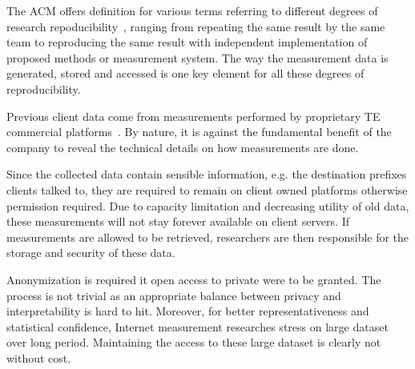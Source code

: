 The \acf{ACM} offers definition for various terms referring to different degrees of research repoducibility~\cite{acm}, ranging from repeating the same result by the same team to reproducing the same result with independent implementation of proposed methods or measurement system.
The way the measurement data is generated, stored and accessed is one key element for all these degrees of reproducibility.

Previous client data come from measurements performed by proprietary TE commercial platforms~\cite{b6}.
By nature, it is against the fundamental benefit of the company to reveal the technical details on how measurements are done. 

Since the collected data contain sensible information, e.g. the destination prefixes clients talked to, they are required to remain on client owned platforms otherwise permission required. Due to capacity limitation and decreasing utility of old data, these measurements will not stay forever available on client servers. If measurements are allowed to be retrieved, researchers are then responsible for the storage and security of these data. 

Anonymization is required it open access to private were to be granted. The process is not trivial as an appropriate balance between privacy and interpretability is hard to hit. 
Moreover, for better representativeness and statistical confidence, Internet measurement researches stress on large dataset over long period. 
Maintaining the access to these large dataset is clearly not without cost. 

